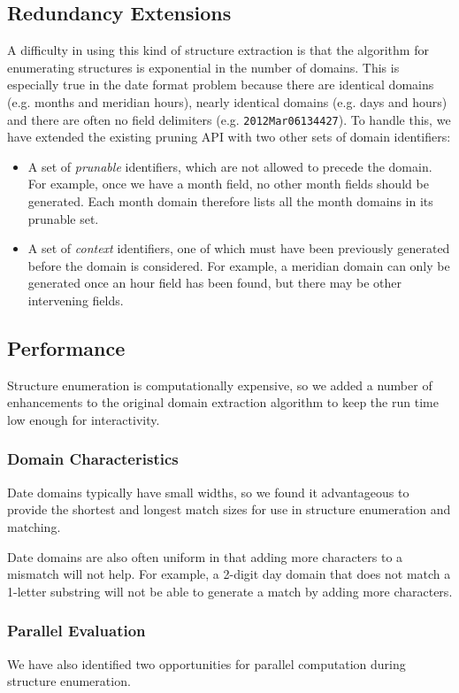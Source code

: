 \subsection{Redundancy Extensions}
A difficulty in using this kind of structure extraction is that the algorithm for enumerating structures is exponential in the number of domains. This is especially true in the date format problem because there are identical domains (e.g. months and meridian hours), nearly identical domains (e.g. days and hours) and there are often no field delimiters (e.g. \texttt{2012Mar06134427}). To handle this, we have extended the existing pruning API with two other sets of domain identifiers:
\begin{itemize}
\item A set of \textit{prunable} identifiers, which are not allowed to precede the domain. For example, once we have a month field, no other month fields should be generated. Each month domain therefore lists all the month domains in its prunable set.
\item A set of \textit{context} identifiers, one of which must have been previously generated before the domain is considered. For example, a meridian domain can only be generated once an hour field has been found, but there may be other intervening fields.
\end{itemize}

\subsection{Performance}
Structure enumeration is computationally expensive, so we added a number of enhancements to the original domain extraction algorithm to keep the run time low enough for interactivity.

\subsubsection{Domain Characteristics}
Date domains typically have small widths, so we found it advantageous to provide the shortest and longest match sizes for use in structure enumeration and matching.

Date domains are also often uniform in that adding more characters to a mismatch will not help. For example, a 2-digit day domain that does not match a 1-letter substring will not be able to generate a match by adding more characters.

\subsubsection{Parallel Evaluation}
We have also identified two opportunities for parallel computation during structure enumeration.

